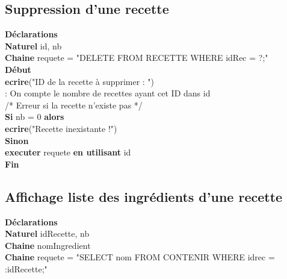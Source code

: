 \documentclass[a4paper,10pt]{report}
\begin{document}
\subsection{Suppression d'une recette}

\textbf{Déclarations}\\
	\indent\indent\textbf{Naturel} id, nb\\
	\indent\indent\textbf{Chaine} requete = "DELETE FROM RECETTE WHERE idRec = ?;"\\

\textbf{Début}\\
	\indent\indent \textbf{ecrire}("ID de la recette à supprimer : ")\\
	\indent\indent {} : On compte le nombre de recettes ayant cet ID dans id\\
	\indent\indent /* Erreur si la recette n'existe pas */ \\
	\indent\indent \textbf{Si} nb = 0 \textbf{alors}\\
		\indent\indent\indent \textbf{ecrire}("Recette inexistante !")\\
	\indent\indent \textbf{Sinon} \\
		\indent\indent\indent\textbf{executer} requete \textbf{en utilisant} id \\
\indent\textbf{Fin}\\
	
\subsection{Affichage liste des ingrédients d'une recette}

\textbf{Déclarations}\\
	\indent\indent\textbf{Naturel} idRecette, nb\\
	\indent\indent\textbf{Chaine} nomIngredient \\
	\indent\indent\textbf{Chaine} requete = "SELECT nom FROM CONTENIR WHERE idrec = :idRecette;"\\
\end{document}
